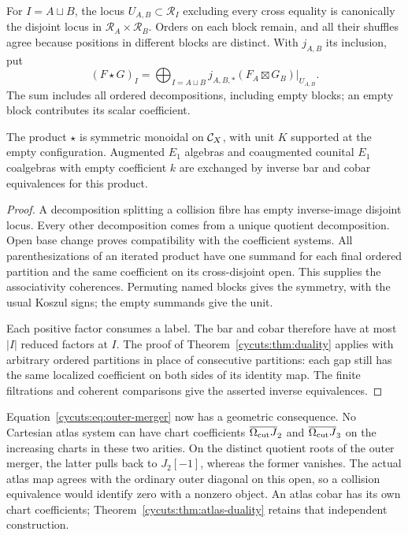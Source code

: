 For $I=A\sqcup B$, the locus $U_{A,B}\subset\mathscr R_I$ excluding every cross
equality is canonically the disjoint locus in
$\mathscr R_A\times\mathscr R_B$. Orders on each block remain,
and all their shuffles agree because positions in different blocks
are distinct. With $j_{A,B}$ its inclusion, put
\begin{equation}\label{cycuts:eq:atlas-product}
 (F\star G)_I=
 \bigoplus_{I=A\sqcup B}j_{A,B,*}
              (F_A\boxtimes G_B)|_{U_{A,B}}.
\end{equation}
The sum includes all ordered decompositions, including empty blocks;
an empty block contributes its scalar coefficient.

\begin{theorem}\label{cycuts:thm:atlas-duality}
The product $\star$ is symmetric monoidal on $\mathcal C_X$, with unit $K$
supported at the empty configuration. Augmented $E_1$ algebras and
coaugmented counital $E_1$ coalgebras with empty coefficient $k$ are
exchanged by inverse bar and cobar equivalences for this product.
\end{theorem}
\begin{proof}
A decomposition splitting a collision fibre has empty inverse-image
disjoint locus. Every other decomposition comes from a unique quotient
decomposition. Open base change proves compatibility with the coefficient
systems. All parenthesizations of an iterated product have one summand
for each final ordered partition and the same coefficient on its
cross-disjoint open. This supplies the associativity coherences.
Permuting named blocks gives the symmetry, with the usual Koszul signs;
the empty summands give the unit.

Each positive factor consumes a label. The bar and cobar therefore
have at most $|I|$ reduced factors at $I$. The proof of
Theorem~\ref{cycuts:thm:duality} applies with arbitrary ordered
partitions in place of consecutive partitions: each gap still has
the same localized coefficient on both sides of its identity map.
The finite filtrations and coherent comparisons give the asserted
inverse equivalences.
\end{proof}

Equation~\eqref{cycuts:eq:outer-merger} now has a geometric consequence.
No Cartesian atlas system can have chart coefficients
$\overline{\Omega_{\mathrm{cut}} J}_2$ and $\overline{\Omega_{\mathrm{cut}} J}_3$ on the increasing
charts in these two arities. On the distinct quotient roots of the
outer merger, the latter pulls back to $J_2[-1]$, whereas the former
vanishes. The actual atlas map agrees with the ordinary outer diagonal
on this open, so a collision equivalence would identify
zero with a nonzero object. An atlas cobar has its own chart
coefficients; Theorem~\ref{cycuts:thm:atlas-duality} retains that
independent construction.

